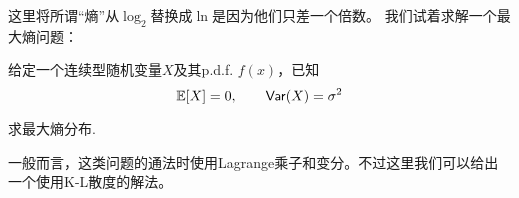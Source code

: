 这里将所谓“熵”从$\log_2$替换成$\ln$是因为他们只差一个倍数。 我们试着求解一个最大熵问题：
\begin{example}
    给定一个连续型随机变量$X$及其p.d.f. $f(x)$，已知
    \[
    \mathbb{E}[X] = 0, \qquad \mathsf{Var}(X) = \sigma^2
    \]
    
    求最大熵分布. 
\end{example}
\begin{solution}
    一般而言，这类问题的通法时使用Lagrange乘子和变分。不过这里我们可以给出一个使用K-L散度的解法。 


\end{solution}
